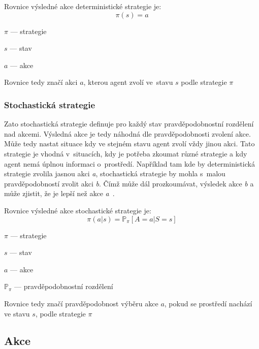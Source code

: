   Rovnice výsledné akce deterministické strategie je:
  \begin{equation}
    \pi(s) = a\label{eq:policy_deterministic}
  \end{equation}
\begin{myitemize}
  \item $\pi$ --- strategie
  \item $s$ --- stav
  \item $a$ --- akce
  \item Rovnice tedy značí akci $a$, kterou agent zvolí ve~stavu $s$ podle strategie $\pi$

\end{myitemize}

  \subsubsection*{Stochastická strategie}
  
  Zato stochastická strategie definuje pro každý stav pravděpodobnostní rozdělení nad akcemi.
  Výsledná akce je tedy náhodná dle pravděpodobnosti zvolení akce.
  Může tedy nastat situace kdy ve stejném stavu agent zvolí vždy jinou akci.
  Tato strategie je vhodná v~situacích, kdy je potřeba zkoumat různé strategie a kdy agent nemá úplnou informaci o~prostředí.
  Například tam kde by deterministická strategie zvolila jasnou akci \textit{a}, stochastická strategie by mohla s~malou pravděpodobností zvolit akci \textit{b}.
  Čímž může dál prozkoumávat, výsledek akce \textit{b} a může zjistit, že je lepší než akce \textit{a}~\cite{Policies}.

  Rovnice výsledné akce stochastické strategie je:
  \begin{equation}
    \pi(a \vert s) = \mathbb{P}_\pi [A=a \vert S=s]\label{eq:policy_stochastic}
  \end{equation}

  \begin{myitemize}
    \item $\pi$ --- strategie
    \item $s$ --- stav
    \item $a$ --- akce
    \item $\mathbb{P}_\pi$ --- pravděpodobnostní rozdělení
    \item Rovnice tedy značí pravděpodobnost výběru akce $a$, pokud se prostředí nachází ve stavu $s$, podle strategie $\pi$
  \end{myitemize}
  

\subsection{Akce}\label{subsec:akce}

